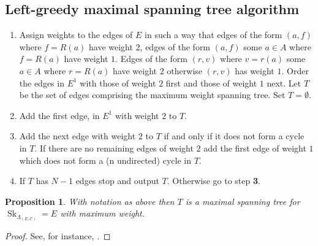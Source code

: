 \documentclass[12pt]{amsart}
\newtheorem{prop}[thm]{Proposition}
\theoremstyle{definition}
\theoremstyle{remark}
\numberwithin{equation}{section}
\newcommand{\Cc}{\mathcal{C}}
\newcommand{\Sk}{\operatorname{Sk}}
\begin{document}
\subsection{Left-greedy maximal spanning tree algorithm} \label{sec:greedy}
\begin{enumerate}[label={\bf \arabic*.}]
\item  Assign weights to the edges of $E$ in such a way that edges of the form $(a,f)$ where $f=R(a)$ have weight $2$, edges of the form $(a,f)$ some $a \in A$ where $f=R(a)$ have weight $1$. Edges of the form $(r,v)$ where $v=r(a)$ some $a \in A$ where $r=R(a)$ have weight $2$ otherwise $(r,v)$ has weight $1$.  Order the edges in $E^1$ with those of weight $2$ first and those of weight $1$ next. Let $T$ be the set of edges comprising the maximum weight spanning tree. Set $T = \emptyset$.
\item Add the first edge, in $E^1$ with weight $2$ to $T$.
\item Add the next edge with weight $2$ to $T$ if and only if it does not form a cycle in $T$. If there are no remaining edges of weight $2$ add the first edge of weight $1$ which does not form a (n undirected) cycle in $T$.
\item If $T$ has $N-1$ edges stop and output $T$. Otherwise go to step {\bf 3}.
\end{enumerate}

\begin{prop} With notation as above then $T$ is a maximal spanning tree for $\Sk_{\Lambda_{(E,\Cc)}}=E$ with maximum weight.
\end{prop}

\begin{proof}
See, for instance, \cite[Theorem 10]{Bo}.
\end{proof}
\end{document}
